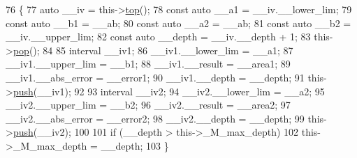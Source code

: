 \begin{DoxyCode}
76     \{
77       \textcolor{keyword}{auto} \_\_iv = this->\hyperlink{class____gnu__cxx_1_1integration__workspace_ad04bd21f3292fa2d0093412f97e969b4}{top}();
78       \textcolor{keyword}{const} \textcolor{keyword}{auto} \_\_a1 = \_\_iv.\_\_lower\_lim;
79       \textcolor{keyword}{const} \textcolor{keyword}{auto} \_\_b1 = \_\_ab;
80       \textcolor{keyword}{const} \textcolor{keyword}{auto} \_\_a2 = \_\_ab;
81       \textcolor{keyword}{const} \textcolor{keyword}{auto} \_\_b2 = \_\_iv.\_\_upper\_lim;
82       \textcolor{keyword}{const} \textcolor{keyword}{auto} \_\_depth = \_\_iv.\_\_depth + 1;
83       this->\hyperlink{class____gnu__cxx_1_1integration__workspace_a61069f2e98ee9e8b7cfcb88a02bc28ff}{pop}();
84 
85       interval \_\_iv1;
86       \_\_iv1.\_\_lower\_lim = \_\_a1;
87       \_\_iv1.\_\_upper\_lim = \_\_b1;
88       \_\_iv1.\_\_result = \_\_area1;
89       \_\_iv1.\_\_abs\_error = \_\_error1;
90       \_\_iv1.\_\_depth = \_\_depth;
91       this->\hyperlink{class____gnu__cxx_1_1integration__workspace_a3d4ccc05a0cc0a2cda9cf2a5243b804d}{push}(\_\_iv1);
92 
93       interval \_\_iv2;
94       \_\_iv2.\_\_lower\_lim = \_\_a2;
95       \_\_iv2.\_\_upper\_lim = \_\_b2;
96       \_\_iv2.\_\_result = \_\_area2;
97       \_\_iv2.\_\_abs\_error = \_\_error2;
98       \_\_iv2.\_\_depth = \_\_depth;
99       this->\hyperlink{class____gnu__cxx_1_1integration__workspace_a3d4ccc05a0cc0a2cda9cf2a5243b804d}{push}(\_\_iv2);
100 
101       \textcolor{keywordflow}{if} (\_\_depth > this->\_M\_max\_depth)
102         this->\_M\_max\_depth = \_\_depth;
103     \}
\end{DoxyCode}
\mbox{\label{class____gnu__cxx_1_1integration__workspace_a56057c37b02b717d5f582bdaafea62e5}} 
